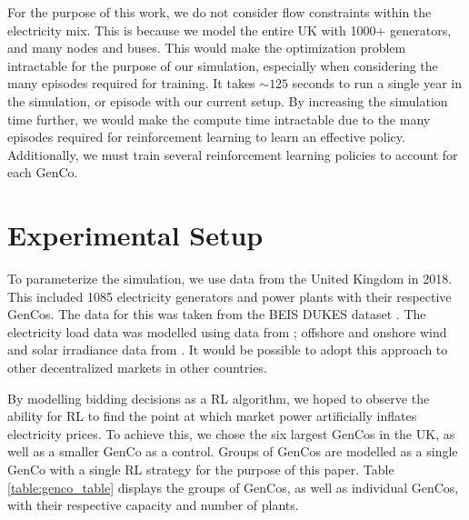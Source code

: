 \documentclass[conference]{IEEEtran}
\begin{document}
For the purpose of this work, we do not consider flow constraints within the electricity mix. This is because we model the entire UK with 1000+ generators, and many nodes and buses. This would make the optimization problem intractable for the purpose of our simulation, especially when considering the many episodes required for training. It takes ${\sim}125$ seconds to run a single year in the simulation, or episode with our current setup. By increasing the simulation time further, we would make the compute time intractable due to the many episodes required for reinforcement learning to learn an effective policy. Additionally, we must train several reinforcement learning policies to account for each GenCo. 









\section{Experimental Setup}
\label{sec:methodology}


To parameterize the simulation, we use data from the United Kingdom in 2018. This included 1085 electricity generators and power plants with their respective GenCos. The data for this was taken from the BEIS DUKES dataset \cite{dukes_511}. The electricity load data was modelled using data from \cite{gridwatch}; offshore and onshore wind and solar irradiance data from \cite{Pfenninger2016}. It would be possible to adopt this approach to other decentralized markets in other countries.

By modelling bidding decisions as a RL algorithm, we hoped to observe the ability for RL to find the point at which market power artificially inflates electricity prices. To achieve this, we chose the six largest GenCos in the UK, as well as a smaller GenCo as a control. Groups of GenCos are modelled as a single GenCo with a single RL strategy for the purpose of this paper. Table \ref{table:genco_table} displays the groups of GenCos, as well as individual GenCos, with their respective capacity and number of plants.
\end{document}
